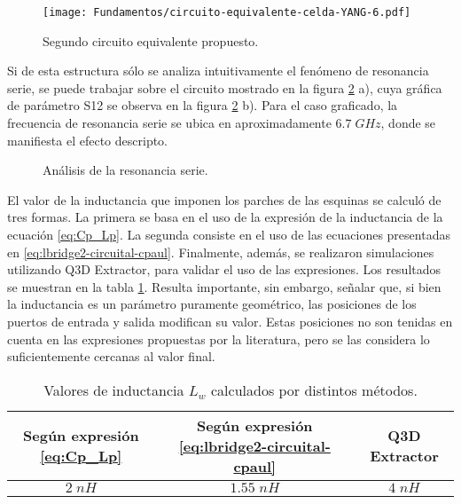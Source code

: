 \begin{figure}[h]
	\centering
	\texttt{[image: Fundamentos/circuito-equivalente-celda-YANG-6.pdf]}
	\caption{Segundo circuito equivalente propuesto.}
	\label{fig:modelo-circuital-con-lw}
\end{figure}

Si de esta estructura sólo se analiza intuitivamente el fenómeno de resonancia serie, se puede trabajar sobre el circuito mostrado en la figura \ref{fig:p13-p14-sdf} a), cuya gráfica de parámetro S12 se observa en la figura \ref{fig:p13-p14-sdf} b). Para el caso graficado, la frecuencia de resonancia serie se ubica en aproximadamente $6.7\; GHz$, donde se manifiesta el efecto descripto.

\begin{figure}[H]
	\centering 
	\hspace{0pt}
	\caption{Análisis de la resonancia serie.}
	\label{fig:p13-p14-sdf}
\end{figure}

El valor de la inductancia que imponen los parches de las esquinas se calculó de tres formas. La primera se basa en el uso de la expresión de la inductancia de la ecuación \ref{eq:Cp_Lp}. La segunda consiste en el uso de las ecuaciones presentadas en \ref{eq:lbridge2-circuital-cpaul}. Finalmente, además, se realizaron simulaciones utilizando Q3D Extractor, para validar el uso de las expresiones. Los resultados se muestran en la tabla \ref{table:lw}. Resulta importante, sin embargo, señalar que, si bien la inductancia es un parámetro puramente geométrico, las posiciones de los puertos de entrada y salida modifican su valor. Estas posiciones no son tenidas en cuenta en las expresiones propuestas por la literatura, pero se las considera lo suficientemente cercanas al valor final.

\begin{table}
	\centering
	\begin{tabular}{|c|c|c|}
		\hline 
		Según expresión \ref{eq:Cp_Lp} & Según expresión \ref{eq:lbridge2-circuital-cpaul} & Q3D Extractor \\ 
		\hline 
		$2\;nH$ & $1.55\;nH$ & $4\;nH$\\ 
		\hline 
	\end{tabular}
	\caption{Valores de inductancia $L_w$ calculados por distintos métodos.}
	\label{table:lw}
\end{table}

